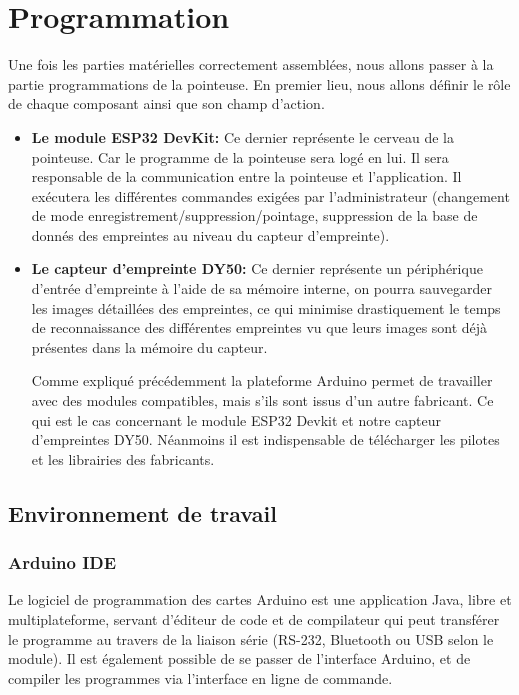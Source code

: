     
\section{Programmation}
Une fois les parties matérielles correctement assemblées, nous allons passer à 
la partie programmations de la pointeuse. En premier lieu, nous allons définir 
le rôle de chaque composant ainsi que son champ d’action.

\begin{itemize}
    \item[\textbullet] \textbf{Le module ESP32 DevKit:} Ce dernier représente le 
        cerveau de la pointeuse. Car le programme de la pointeuse sera logé en lui. Il 
        sera responsable de la communication entre la pointeuse et l’application. Il 
        exécutera les différentes commandes exigées par l’administrateur (changement de 
        mode enregistrement/suppression/pointage, suppression de la base de donnés des 
        empreintes au niveau du capteur d’empreinte).  
    
    \item[\textbullet] \textbf{Le capteur d'empreinte DY50:} Ce dernier représente 
    un périphérique d’entrée d’empreinte à l’aide de sa mémoire interne, on pourra 
    sauvegarder les images détaillées des empreintes, ce qui minimise drastiquement le 
    temps de reconnaissance des différentes empreintes vu que leurs images sont déjà 
    présentes dans la mémoire du capteur.
        
    Comme expliqué précédemment la plateforme Arduino permet de travailler avec des 
    modules compatibles, mais s’ils sont issus d’un autre fabricant. Ce qui est le 
    cas concernant le module ESP32 Devkit et notre capteur d’empreintes DY50. 
    Néanmoins il est indispensable de télécharger les pilotes et les librairies des fabricants.    
\end{itemize}

\subsection{Environnement de travail}
        
\subsubsection{Arduino IDE }
Le logiciel de programmation des cartes Arduino est une application Java, libre 
et multiplateforme, servant d'éditeur de code et de compilateur qui peut 
transférer le programme au travers de la liaison série (RS-232, Bluetooth ou USB 
selon le module). Il est également possible de se passer de l'interface Arduino, 
et de compiler les programmes via l'interface en ligne de commande.
                
